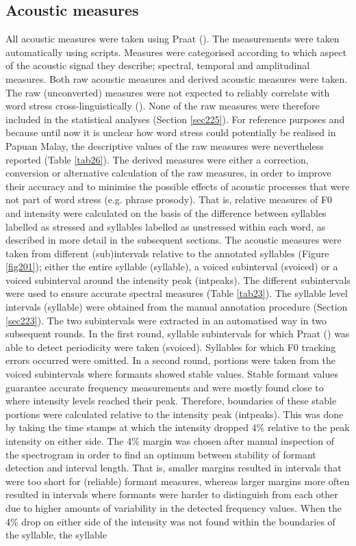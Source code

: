 \subsection{Acoustic measures} \label{sec224}
All acoustic measures were taken using Praat (\citealt{boersma_praat_2017}). The measurements were taken automatically using scripts. Measures were categorised according to which aspect of the acoustic signal they describe; spectral, temporal and amplitudinal measures. Both raw acoustic measures and derived acoustic measures were taken. The raw (unconverted) measures were not expected to reliably correlate with word stress cross-linguistically (\citealt{gordon_acoustic_2017}). None of the raw measures were therefore included in the statistical analyses (Section \ref{sec225}). For reference purposes and because until now it is unclear how word stress could potentially be realised in Papuan Malay, the descriptive values of the raw measures were nevertheless reported (Table \ref{tab26}). The derived measures were either a correction, conversion or alternative calculation of the raw measures, in order to improve their accuracy and to minimise the possible effects of acoustic processes that were not part of word stress (e.g. phrase prosody). That is, relative measures of F0 and intensity were calculated on the basis of the difference between syllables labelled as stressed and syllables labelled as unstressed within each word, as described in more detail in the subsequent sections. The acoustic measures were taken from different (sub)intervals relative to the annotated syllables (Figure \ref{fig201}); either the entire syllable (syllable), a voiced subinterval (svoiced) or a voiced subinterval around the intensity peak (intpeaks). The different subintervals were used to ensure accurate spectral measures (Table \ref{tab23}). The syllable level intervals (syllable) were obtained from the manual annotation procedure (Section \ref{sec223}). The two subintervals were extracted in an automatised way in two subsequent rounds. In the first round, syllable subintervals for which Praat (\citealt{boersma_praat_2017}) was able to detect periodicity were taken (svoiced). Syllables for which F0 tracking errors occurred were omitted. In a second round, portions were taken from the voiced subintervals where formants showed stable values. Stable formant values guarantee accurate frequency measurements and were mostly found close to where intensity levels reached their peak. Therefore, boundaries of these stable portions were calculated relative to the intensity peak (intpeaks). This was done by taking the time stamps at which the intensity dropped 4\% relative to the peak intensity on either side. The 4\% margin was chosen after manual inspection of the spectrogram in order to find an optimum between stability of formant detection and interval length. That is, smaller margins resulted in intervals that were too short for (reliable) formant measures, whereas larger margins more often resulted in intervals where formants were harder to distinguish from each other due to higher amounts of variability in the detected frequency values. When the 4\% drop on either side of the intensity was not found within the boundaries of the syllable, the syllable 